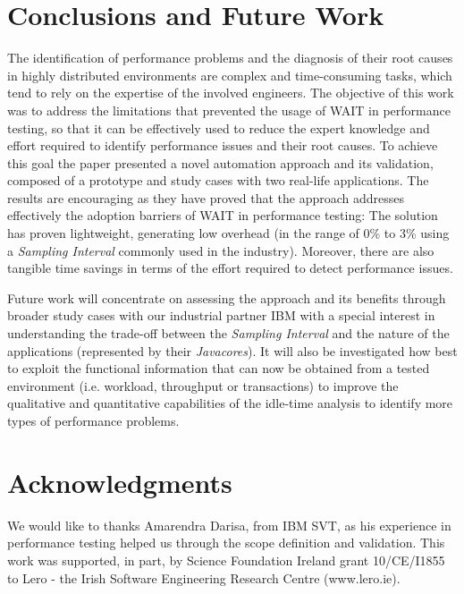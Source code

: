 \documentclass[runningheads,a4paper]{llncs}
\begin{document}
\vspace{-5pt}
\section{Conclusions and Future Work}
\vspace{-5pt}
The identification of performance problems and the diagnosis of their root
causes in highly distributed environments are complex and time-consuming tasks,
which tend to rely on the expertise of the involved engineers. The objective of
this work was to address the limitations that prevented the usage of WAIT in
performance testing, so that it can be effectively used to reduce the expert
knowledge and effort required to identify performance issues and their root
causes. To achieve this goal the paper presented a novel automation approach
and its validation, composed of a prototype and study cases with two real-life
applications. The results are encouraging as they have proved that the approach
addresses effectively the adoption barriers of WAIT in performance testing: The
solution has proven lightweight, generating low overhead (in the range of 0\%
to 3\% using a \emph{Sampling Interval} commonly used in the industry). Moreover,
there are also tangible time savings in terms of the effort required to detect
performance issues.

Future work will concentrate on assessing the approach and its benefits through
broader study cases with our industrial partner IBM with a special interest in
understanding the trade-off between the \emph{Sampling Interval} and the nature
of the applications (represented by their \emph{Javacores}). It will also be
investigated how best to exploit the functional information that can now be
obtained from a tested environment (i.e. workload, throughput or transactions)
to improve the qualitative and quantitative capabilities of the idle-time
analysis to identify more types of performance problems.

\vspace{-5pt}
\section*{Acknowledgments}
\vspace{-5pt}
We would like to thanks Amarendra Darisa, from IBM SVT, as his experience in
performance testing helped us through the scope definition and validation. This
work was supported, in part, by Science Foundation Ireland grant 10/CE/I1855 to
Lero - the Irish Software Engineering Research Centre (www.lero.ie).




\end{document}
